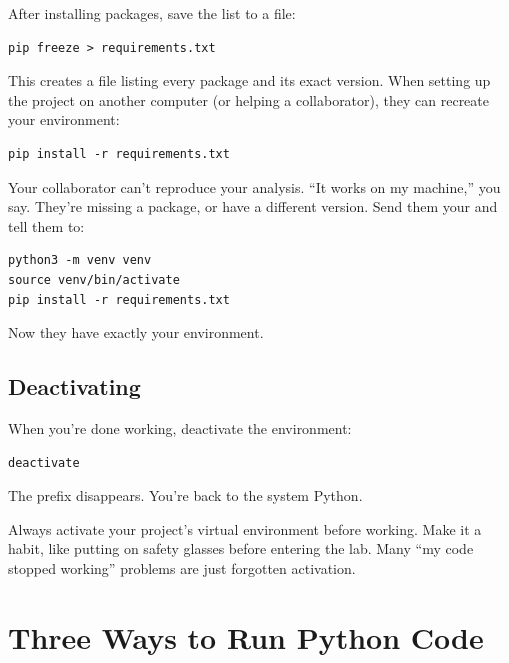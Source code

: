 After installing packages, save the list to a file:

\begin{lstlisting}[style=shellstyle]
pip freeze > requirements.txt
\end{lstlisting}

This creates a  file listing every package and its exact version. When setting up the project on another computer (or helping a collaborator), they can recreate your environment:

\begin{lstlisting}[style=shellstyle]
pip install -r requirements.txt
\end{lstlisting}

\begin{labexample}
Your collaborator can't reproduce your analysis. ``It works on my machine,'' you say. They're missing a package, or have a different version. Send them your  and tell them to:
\begin{lstlisting}[style=shellstyle]
python3 -m venv venv
source venv/bin/activate
pip install -r requirements.txt
\end{lstlisting}
Now they have exactly your environment.
\end{labexample}

\subsection{Deactivating}

When you're done working, deactivate the environment:

\begin{lstlisting}[style=shellstyle]
deactivate
\end{lstlisting}

The  prefix disappears. You're back to the system Python.

\begin{tip}
Always activate your project's virtual environment before working. Make it a habit, like putting on safety glasses before entering the lab. Many ``my code stopped working'' problems are just forgotten activation.
\end{tip}

\section{Three Ways to Run Python Code}
\label{sec:three-ways}

